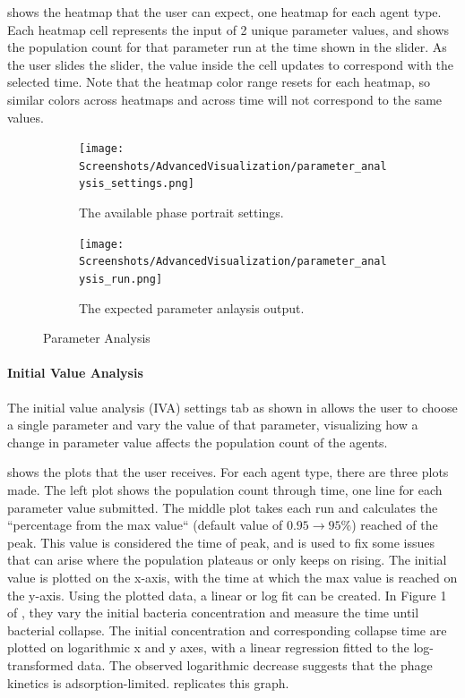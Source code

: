  shows the heatmap that the user can expect, one heatmap for each agent type.
Each heatmap cell represents the input of 2 unique parameter values, and shows the population count for that parameter run at the time shown in the slider. 
As the user slides the slider, the value inside the cell updates to correspond with the selected time. 
Note that the heatmap color range resets for each heatmap, so similar colors across heatmaps and across time will not correspond to the same values.

\begin{figure}[h!]
    \centering
    \begin{subfigure}{0.49\linewidth}
        \centering
        \captionsetup{width=1\linewidth}
        \texttt{[image: Screenshots/AdvancedVisualization/parameter\_analysis\_settings.png]}
        \caption{
            The available phase portrait settings. 
        }
        \label{fig:ss:av:parameter_analysis_settings}
    \end{subfigure}
    \hfill
    \begin{subfigure}{0.49\linewidth}
        \centering
        \captionsetup{width=1\linewidth}
        \texttt{[image: Screenshots/AdvancedVisualization/parameter\_analysis\_run.png]}
        \caption{
            The expected parameter anlaysis output. 
        }
        \label{fig:ss:av:parameter_analysis_run}
    \end{subfigure}
    \caption{Parameter Analysis}
\end{figure}


\paragraph{Initial Value Analysis}
\label{sec:initial_value_analysis}
The initial value analysis (IVA) settings tab as shown in  allows the user to choose a single parameter and vary the value of that parameter, visualizing how a change in parameter value affects the population count of the agents.

 shows the plots that the user receives.
For each agent type, there are three plots made.
The left plot shows the population count through time, one line for each parameter value submitted.
The middle plot takes each run and calculates the “percentage from the max value“ (default value of $0.95 \rightarrow 95\%$) reached of the peak.
This value is considered the time of peak, and is used to fix some issues that can arise where the population plateaus or only keeps on rising.
The initial value is plotted on the x-axis, with the time at which the max value is reached on the y-axis.
Using the plotted data, a linear or log fit can be created.
In Figure 1 of \citet{mullaExtremeDiversityPhage2024}, they vary the initial bacteria concentration and measure the time until bacterial collapse. 
The initial concentration and corresponding collapse time are plotted on logarithmic x and y axes, with a linear regression fitted to the log-transformed data.
The observed logarithmic decrease suggests that the phage kinetics is adsorption-limited. 
 replicates this graph. 

